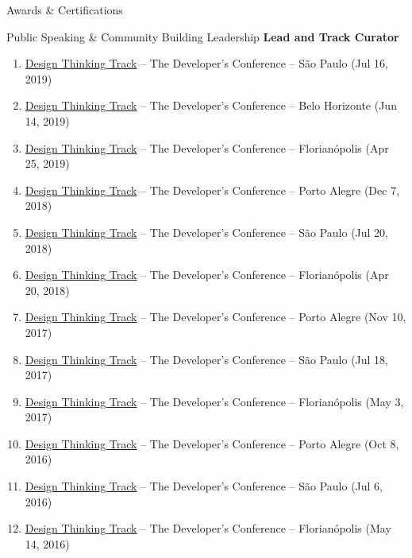 \documentclass{resume} %
\begin{document}
\begin{rSection}{Awards \& Certifications}
\begin{rSection}{Public Speaking \& Community Building Leadership}
\textbf{Lead and Track Curator}

\begin{enumerate}
    \item  \href{https://thedevconf.com/tdc/2019/saopaulo/trilha-design-thinking}{Design Thinking Track} -- The Developer's Conference -- São Paulo (Jul 16, 2019)
    \item  \href{https://thedevconf.com/tdc/2019/belohorizonte/trilha-design-thinking}{Design Thinking Track} -- The Developer's Conference -- Belo Horizonte (Jun 14, 2019)
    \item  \href{https://thedevconf.com/tdc/2019/florianopolis/trilha-design-thinking}{Design Thinking Track} -- The Developer's Conference -- Florianópolis (Apr 25, 2019)
    \item  \href{https://thedevconf.com/tdc/2018/portoalegre/trilha-design-thinking}{Design Thinking Track} -- The Developer's Conference -- Porto Alegre (Dec 7, 2018)
    \item  \href{https://thedevconf.com/tdc/2018/saopaulo/trilha-design-thinking}{Design Thinking Track} -- The Developer's Conference -- São Paulo (Jul 20, 2018)
    \item  \href{https://thedevconf.com/tdc/2018/florianopolis/trilha-design-thinking}{Design Thinking Track} -- The Developer's Conference -- Florianópolis (Apr 20, 2018)
    \item  \href{https://thedevconf.com/tdc/2017/portoalegre/trilha-design-thinking}{Design Thinking Track} -- The Developer's Conference -- Porto Alegre (Nov 10, 2017)
    \item  \href{https://thedevconf.com/tdc/2017/saopaulo/trilha-design-thinking}{Design Thinking Track} -- The Developer's Conference -- São Paulo (Jul 18, 2017)
    \item  \href{https://thedevconf.com/tdc/2017/florianopolis/trilha-design-thinking}{Design Thinking Track} -- The Developer's Conference -- Florianópolis (May 3, 2017)
    \item  \href{https://thedevconf.com/tdc/2016/portoalegre/trilha-design-thinking}{Design Thinking Track} -- The Developer's Conference -- Porto Alegre (Oct 8, 2016)
    \item  \href{https://thedevconf.com/tdc/2016/saopaulo/trilha-design-thinking}{Design Thinking Track} -- The Developer's Conference -- São Paulo (Jul 6, 2016)
    \item  \href{https://thedevconf.com/tdc/2016/florianopolis/trilha-design-thinking}{Design Thinking Track} -- The Developer's Conference -- Florianópolis (May 14, 2016)

\end{enumerate}
\end{rSection}
\end{rSection}
\end{document}
